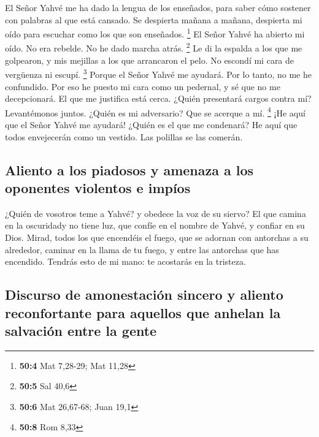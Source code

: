  El Señor Yahvé me ha dado la lengua de los enseñados,
para saber cómo sostener con palabras al que está cansado. Se despierta
mañana a mañana, despierta mi oído para escuchar como los que son
enseñados. \footnote{\textbf{50:4} Mat 7,28-29; Mat 11,28}
 El Señor Yahvé ha abierto mi oído. No era rebelde. No he
dado marcha atrás. \footnote{\textbf{50:5} Sal 40,6}  Le
di la espalda a los que me golpearon, y mis mejillas a los que
arrancaron el pelo. No escondí mi cara de vergüenza ni escupí.
\footnote{\textbf{50:6} Mat 26,67-68; Juan 19,1}  Porque
el Señor Yahvé me ayudará. Por lo tanto, no me he confundido. Por eso he
puesto mi cara como un pedernal, y sé que no me decepcionará.
 El que me justifica está cerca. ¿Quién presentará cargos
contra mí? Levantémonos juntos. ¿Quién es mi adversario? Que se acerque
a mí. \footnote{\textbf{50:8} Rom 8,33}  ¡He aquí que el
Señor Yahvé me ayudará! ¿Quién es el que me condenará? He aquí que todos
envejecerán como un vestido. Las polillas se las comerán.

\hypertarget{aliento-a-los-piadosos-y-amenaza-a-los-oponentes-violentos-e-impuxedos}{%
\subsection{Aliento a los piadosos y amenaza a los oponentes violentos e
impíos}\label{aliento-a-los-piadosos-y-amenaza-a-los-oponentes-violentos-e-impuxedos}}

 ¿Quién de vosotros teme a Yahvé? y obedece la voz de su
siervo? El que camina en la oscuridady no tiene luz, que confíe en el
nombre de Yahvé, y confiar en su Dios.  Mirad, todos los
que encendéis el fuego, que se adornan con antorchas a su alrededor,
caminar en la llama de tu fuego, y entre las antorchas que has
encendido. Tendrás esto de mi mano: te acostarás en la tristeza.

\hypertarget{discurso-de-amonestaciuxf3n-sincero-y-aliento-reconfortante-para-aquellos-que-anhelan-la-salvaciuxf3n-entre-la-gente}{%
\subsection{Discurso de amonestación sincero y aliento reconfortante
para aquellos que anhelan la salvación entre la
gente}\label{discurso-de-amonestaciuxf3n-sincero-y-aliento-reconfortante-para-aquellos-que-anhelan-la-salvaciuxf3n-entre-la-gente}}

